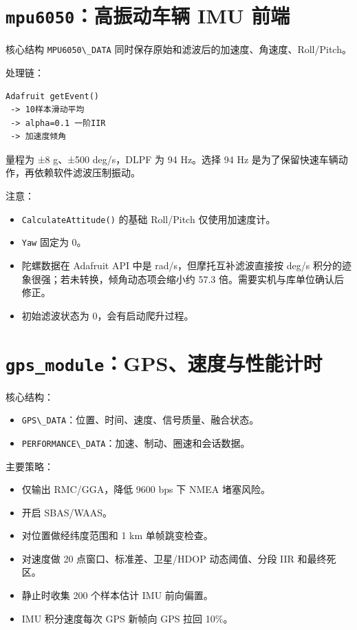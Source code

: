 \documentclass[
  UTF8,11pt,a4paper]{ctexart}
\newcommand{\passthrough}[1]{#1}
\providecommand{\tightlist}{%
  \setlength{\itemsep}{0pt}\setlength{\parskip}{0pt}}
\begin{document}
\section{\texorpdfstring{\texttt{mpu6050}：高振动车辆 IMU
前端}{mpu6050：高振动车辆 IMU 前端}}\label{mpu6050ux9ad8ux632fux52a8ux8f66ux8f86-imu-ux524dux7aef}

核心结构 \passthrough{\lstinline!MPU6050\_DATA!}
同时保存原始和滤波后的加速度、角速度、Roll/Pitch。

处理链：

\begin{lstlisting}
Adafruit getEvent()
 -> 10样本滑动平均
 -> alpha=0.1 一阶IIR
 -> 加速度倾角
\end{lstlisting}

量程为 ±8 g、±500 deg/s，DLPF 为 94 Hz。选择 94 Hz
是为了保留快速车辆动作，再依赖软件滤波压制振动。

注意：

\begin{itemize}
\tightlist
\item
  \passthrough{\lstinline!CalculateAttitude()!} 的基础 Roll/Pitch
  仅使用加速度计。
\item
  \passthrough{\lstinline!Yaw!} 固定为 0。
\item
  陀螺数据在 Adafruit API 中是 rad/s，但摩托互补滤波直接按 deg/s
  积分的迹象很强；若未转换，倾角动态项会缩小约 57.3
  倍。需要实机与库单位确认后修正。
\item
  初始滤波状态为 0，会有启动爬升过程。
\end{itemize}

\section{\texorpdfstring{\texttt{gps\_module}：GPS、速度与性能计时}{gps\_module：GPS、速度与性能计时}}\label{gps_modulegpsux901fux5ea6ux4e0eux6027ux80fdux8ba1ux65f6}

核心结构：

\begin{itemize}
\tightlist
\item
  \passthrough{\lstinline!GPS\_DATA!}：位置、时间、速度、信号质量、融合状态。
\item
  \passthrough{\lstinline!PERFORMANCE\_DATA!}：加速、制动、圈速和会话数据。
\end{itemize}

主要策略：

\begin{itemize}
\tightlist
\item
  仅输出 RMC/GGA，降低 9600 bps 下 NMEA 堵塞风险。
\item
  开启 SBAS/WAAS。
\item
  对位置做经纬度范围和 1 km 单帧跳变检查。
\item
  对速度做 20 点窗口、标准差、卫星/HDOP 动态阈值、分段 IIR 和最终死区。
\item
  静止时收集 200 个样本估计 IMU 前向偏置。
\item
  IMU 积分速度每次 GPS 新帧向 GPS 拉回 10\%。
\end{itemize}
\end{document}
